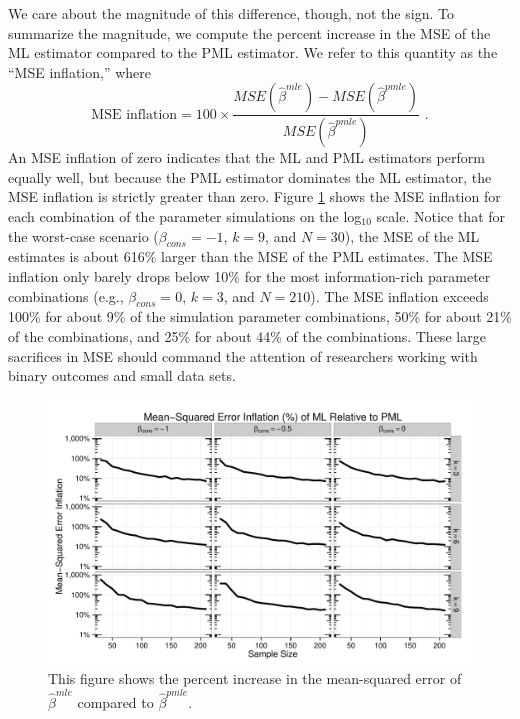 \documentclass[12pt]{article}
\begin{document}
We care about the magnitude of this difference, though, not the sign.
To summarize the magnitude, we compute the percent increase in the MSE of the ML estimator compared to the PML estimator. 
We refer to this quantity as the ``MSE inflation,'' where
\begin{equation}\label{eqn:mse-infl}
\text{MSE inflation} = 100 \times \dfrac{MSE(\hat{\beta}^{mle}) - MSE(\hat{\beta}^{pmle})}{MSE(\hat{\beta}^{pmle})}  \text{ .}
\end{equation}
An MSE inflation of zero indicates that the ML and PML estimators perform equally well, but because the PML estimator dominates the ML estimator, the MSE inflation is strictly greater than zero.
Figure \ref{fig:mse-infl} shows the MSE inflation for each combination of the parameter simulations on the log$_{10}$ scale.
Notice that for the worst-case scenario ($\beta_{cons} = -1$, $k = 9$, and $N = 30$), the MSE of the ML estimates is about 616\% larger than the MSE of the PML estimates.
The MSE inflation only barely drops below 10\% for the most information-rich parameter combinations (e.g., $\beta_{cons} = 0$, $k = 3$, and $N = 210$).
The MSE inflation exceeds 100\% for about 9\% of the simulation parameter combinations, 50\% for about 21\% of the combinations, and 25\% for about 44\% of the combinations.
These large sacrifices in MSE should command the attention of researchers working with binary outcomes and small data sets.

\begin{figure}[h]
\begin{center}
\includegraphics[width = \textwidth]{figs/sims-mse-infl.pdf}
\caption{This figure shows the percent increase in the mean-squared error of $\hat{\beta}^{mle}$ compared to $\hat{\beta}^{pmle}$.}\label{fig:mse-infl}
\end{center}
\end{figure}
\end{document}
